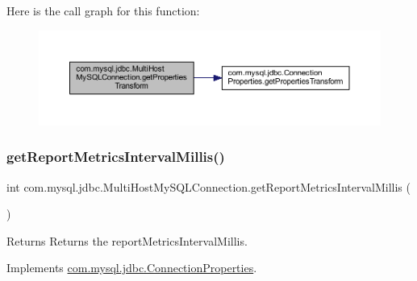 Here is the call graph for this function\+:
\nopagebreak
\begin{figure}[H]
\begin{center}
\leavevmode
\includegraphics[width=350pt]{classcom_1_1mysql_1_1jdbc_1_1_multi_host_my_s_q_l_connection_a209788195dbd1e088e7e245bd783fdc0_cgraph}
\end{center}
\end{figure}
\mbox{\label{classcom_1_1mysql_1_1jdbc_1_1_multi_host_my_s_q_l_connection_a8b847e33c04c41470b7ee6e10dafa60f}} 
\subsubsection{\texorpdfstring{get\+Report\+Metrics\+Interval\+Millis()}{getReportMetricsIntervalMillis()}}
{\footnotesize\ttfamily int com.\+mysql.\+jdbc.\+Multi\+Host\+My\+S\+Q\+L\+Connection.\+get\+Report\+Metrics\+Interval\+Millis (\begin{DoxyParamCaption}{ }\end{DoxyParamCaption})}

\begin{DoxyReturn}{Returns}
Returns the report\+Metrics\+Interval\+Millis. 
\end{DoxyReturn}


Implements \mbox{\hyperlink{interfacecom_1_1mysql_1_1jdbc_1_1_connection_properties_aac4f74c781305ad6b2eb71913e184de3}{com.\+mysql.\+jdbc.\+Connection\+Properties}}.

